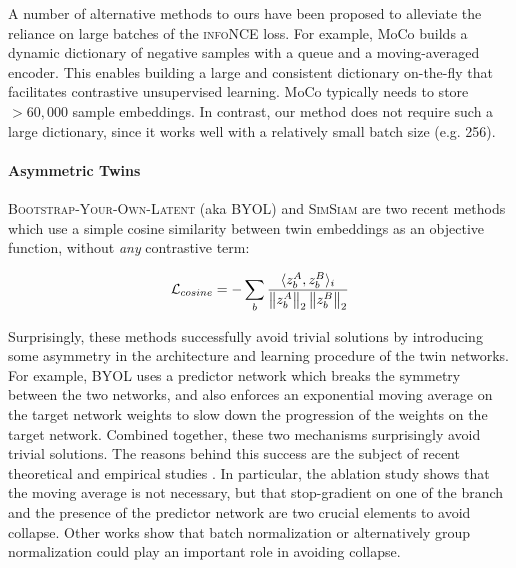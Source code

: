 A number of alternative methods to ours have been proposed to alleviate the reliance on large batches of the \textsc{infoNCE} loss. For example, MoCo \cite{he2019momentum, chen2020improved} builds a dynamic dictionary of negative samples with a queue and a moving-averaged encoder. This enables building a large and consistent dictionary on-the-fly that facilitates contrastive unsupervised learning. MoCo typically needs to store $>60{,}000$ sample embeddings. In contrast, our method does not require such a large dictionary, since it works well with a relatively small batch size (e.g. 256).



\paragraph{Asymmetric Twins}

\textsc{Bootstrap-Your-Own-Latent} (aka \textsc{BYOL}) \cite{grill2020bootstrap} and \textsc{SimSiam} \cite{chen2020exploring} are two recent methods which use a simple cosine similarity between twin embeddings as an objective function, without \emph{any} contrastive term:

\begin{align*}
\mathcal{L}_{cosine} = - \sum_b \frac{\langle z^A_{b}, 
z^B_{b} \rangle_i}{\left\lVert z^A_{b}\right\rVert_2\left\lVert z^B_{b}\right\rVert_2}
\end{align*}

Surprisingly, these methods successfully avoid trivial solutions by introducing some asymmetry in the architecture and learning procedure of the twin networks. For example, \textsc{BYOL} uses a predictor network which breaks the symmetry between the two networks, and also enforces an exponential moving average on the target network weights to slow down the progression of the weights on the target network. Combined together, these two mechanisms surprisingly avoid trivial solutions. The reasons behind this success are the subject of recent theoretical and empirical studies \cite{tian_understanding_2020,chen2020exploring,fetterman_understanding_2020,richemond_byol_2020}. In particular, the ablation study \cite{chen2020exploring} shows that the moving average is not necessary, but that stop-gradient on one of the branch and the presence of the predictor network are two crucial elements to avoid collapse. Other works show that batch normalization \cite{tian_understanding_2020,fetterman_understanding_2020} or alternatively group normalization \cite{richemond_byol_2020} could play an important role in avoiding collapse.

